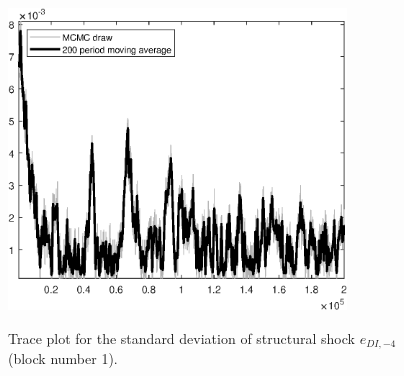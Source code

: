 \begin{figure}[H]
\centering
  \includegraphics[width=0.8\textwidth]{BRS_sectoral_rest/graphs/TracePlot_SE_e_DI_news_blck_1}\\
    \caption{Trace plot for the standard deviation of structural shock ${e_{DI,-4}}$ (block number 1).}
\end{figure}
